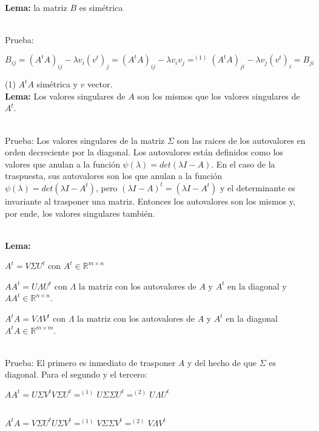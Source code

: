 \ \\
\textbf{Lema:} la matriz $B$ es simétrica

\ \\
Prueba:

\begin{center}
  $B_{ij} = (A^t A)_{ij} - \lambda v_i (v^t)_j = (A^t A)_{ij} - \lambda v_i v_j =^{(1)} (A^t A)_{ji}
  - \lambda v_j (v^t)_i = B_{ji}$
\end{center}

(1) $A^t A$ simétrica y $v$ vector.
\ \\


\newpage
\textbf{Lema:} Los valores singulares de $A$ son los mismos que los valores singulares de $A^t$.

\ \\
Prueba: Los valores singulares de la matriz $\Sigma$ son las raices de los autovalores en orden
decreciente por la diagonal. Los autovalores están definidos como los valores que anulan a la
función
$\psi(\lambda) = det(\lambda I - A)$. En el caso de la traspuesta, sus autovalores son los que
anulan a la función $\psi(\lambda) = det(\lambda I - A^t)$, pero $(\lambda I - A)^t = (\lambda I -
A^t)$ y el determinante es invariante al trasponer una matriz. Entonces los autovalores son los
mismos y, por ende, los valores singulares también.


\ \\
\textbf{Lema:}
\begin{compactitem}
  \item $A^t = V \Sigma U^t$ con $A^t \in \mathbb{R}^{m \times n}$
  \item $A A^t = U \Lambda U^t$ con $\Lambda$ la matriz con los autovalores de $A$ y $A^t$ en
    la diagonal y $A A^t \in \mathbb{R}^{n \times n}$.
  \item $A^t A = V \Lambda V^t $ con $\Lambda$ la matriz con los autovalores de $A$ y $A^t$ en
    la diagonal $A^t A \in \mathbb{R}^{m \times m}$.
\end{compactitem}

\ \\
Prueba: El primero es inmediato de trasponer $A$ y del hecho de que $\Sigma$ es diagonal. Para el
segundo y el tercero:
\begin{center}
$A A^t = U \Sigma V^t V \Sigma U^t =^{(1)} U \Sigma \Sigma U^t =^{(2)} U \Lambda U^t$

\ \\
$A^t A = V \Sigma U^t U \Sigma V^t =^{(1)} V \Sigma \Sigma V^t =^{(2)} V \Lambda V^t$
\end{center}

